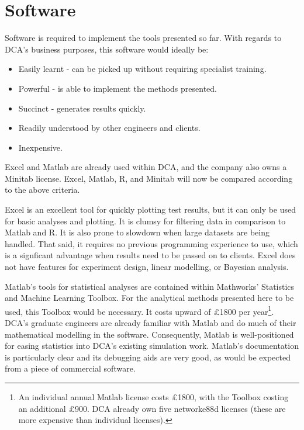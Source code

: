 \documentclass[11pt,a4paper,article]{memoir} %
\begin{document}
\section{Software}
 Software is required to implement the tools presented so far. With regards to DCA's business purposes, this software would ideally be:
 \begin{itemize}
 \item Easily learnt - can be picked up without requiring specialist training.
 \item Powerful - is able to implement the methods presented.
 \item Succinct - generates results quickly.
 \item Readily understood by other engineers and clients.
 \item Inexpensive.
 \end{itemize}
 Excel and Matlab are already used within DCA, and the company also owns a Minitab license. Excel, Matlab, R, and Minitab will now be compared according to the above criteria.
\par
 Excel is an excellent tool for quickly plotting test results, but it can only be used for basic analyses and plotting. It is clumsy for filtering data in comparison to Matlab and R. It is also prone to slowdown when large datasets are being handled. That said, it requires no previous programming experience to use, which is a signficant advantage when results need to be passed on to clients. Excel does not have features for experiment design, linear modelling, or Bayesian analysis.
\par
Matlab's tools for statistical analyses are contained within Mathworks' Statistics and Machine Learning Toolbox. For the analytical methods presented here to be used, this Toolbox would be necessary. It costs upward of £1800 per year\footnote{ An individual annual Matlab license costs £1800, with the Toolbox costing an additional £900. DCA already own five networke88d licenses (these are more expensive than individual licenses).}. DCA's graduate engineers are already familiar with Matlab and do much of their mathematical modelling in the software. Consequently, Matlab is well-positioned for easing statistics into DCA's existing simulation work.  Matlab's documentation is particularly clear and its debugging aids are very good, as would be expected from a piece of commercial software.
\par
\end{document}
